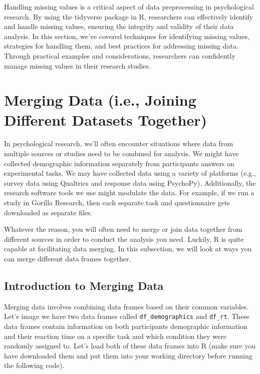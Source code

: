 \documentclass[
]{book}
\begin{document}
Handling missing values is a critical aspect of data preprocessing in psychological research. By using the tidyverse package in R, researchers can effectively identify and handle missing values, ensuring the integrity and validity of their data analysis. In this section, we've covered techniques for identifying missing values, strategies for handling them, and best practices for addressing missing data. Through practical examples and considerations, researchers can confidently manage missing values in their research studies.

\hypertarget{merging-data-i.e.-joining-different-datasets-together}{%
\section{Merging Data (i.e., Joining Different Datasets Together)}\label{merging-data-i.e.-joining-different-datasets-together}}

In psychological research, we'll often encounter situations where data from multiple sources or studies need to be combined for analysis. We might have collected demographic information separately from participants answers on experimental tasks. We may have collected data using a variety of platforms (e.g., survey data using Qualtrics and response data using PsychoPy). Additionally, the research software tools we use might modulate the data. For example, if we run a study in Gorilla Research, then each separate task and questionnaire gets downloaded as separate files.

Whatever the reason, you will often need to merge or join data together from different sources in order to conduct the analysis you need. Luckily, R is quite capable at facilitating data merging. In this subsection, we will look at ways you can merge different data frames together.

\hypertarget{introduction-to-merging-data}{%
\subsection{Introduction to Merging Data}\label{introduction-to-merging-data}}

Merging data involves combining data frames based on their common variables. Let's image we have two data frames called \texttt{df\_demographics} and \texttt{df\_rt}. These data frames contain information on both participants demographic information and their reaction time on a specific task and which condition they were randomly assigned to. Let's load both of these data frames into R (make sure you have downloaded them and put them into your working directory before running the following code).
\end{document}
